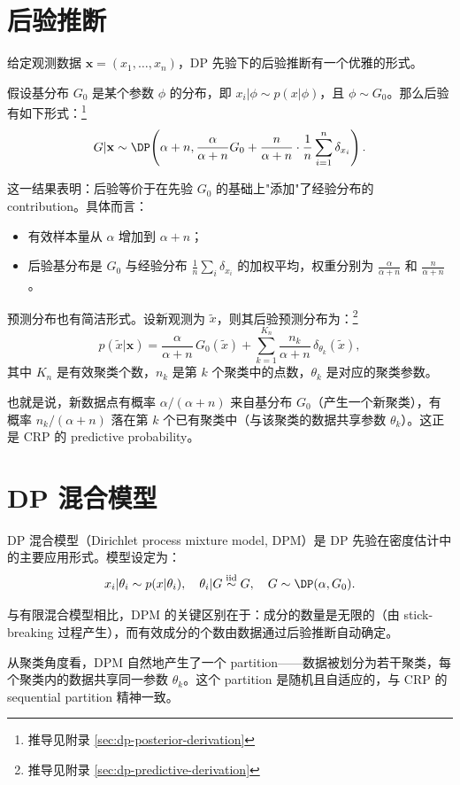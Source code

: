 \section{后验推断}

给定观测数据 $\mathbf{x} = (x_1, \ldots, x_n)$，DP 先验下的后验推断有一个优雅的形式。

假设基分布 $G_0$ 是某个参数 $\phi$ 的分布，即 $x_i | \phi \sim p(x | \phi)$，且 $\phi \sim G_0$。那么后验有如下形式：\footnote{推导见附录 \cref{sec:dp-posterior-derivation}}
\[
G | \mathbf{x} \sim \DP\!\left(\alpha + n, \frac{\alpha}{\alpha + n} G_0 + \frac{n}{\alpha + n} \cdot \frac{1}{n}\sum_{i=1}^n \delta_{x_i}\right).
\]

这一结果表明：后验等价于在先验 $G_0$ 的基础上"添加"了经验分布的 contribution。具体而言：
\begin{itemize}
  \item 有效样本量从 $\alpha$ 增加到 $\alpha + n$；
  \item 后验基分布是 $G_0$ 与经验分布 $\frac{1}{n}\sum_i \delta_{x_i}$ 的加权平均，权重分别为 $\frac{\alpha}{\alpha+n}$ 和 $\frac{n}{\alpha+n}$。
\end{itemize}

预测分布也有简洁形式。设新观测为 $\tilde{x}$，则其后验预测分布为：\footnote{推导见附录 \cref{sec:dp-predictive-derivation}}
\[
p(\tilde{x} | \mathbf{x}) = \frac{\alpha}{\alpha + n} \, G_0(\tilde{x}) + \sum_{k=1}^{K_n} \frac{n_k}{\alpha + n} \, \delta_{\theta_k}(\tilde{x}),
\]
其中 $K_n$ 是有效聚类个数，$n_k$ 是第 $k$ 个聚类中的点数，$\theta_k$ 是对应的聚类参数。

也就是说，新数据点有概率 $\alpha/(\alpha+n)$ 来自基分布 $G_0$（产生一个新聚类），有概率 $n_k/(\alpha+n)$ 落在第 $k$ 个已有聚类中（与该聚类的数据共享参数 $\theta_k$）。这正是 CRP 的 predictive probability。

\section{DP 混合模型}

DP 混合模型（Dirichlet process mixture model, DPM）是 DP 先验在密度估计中的主要应用形式。模型设定为：
\[
x_i | \theta_i \sim p(x | \theta_i), \quad \theta_i | G \stackrel{\mathrm{iid}}{\sim} G, \quad G \sim \DP(\alpha, G_0).
\]

与有限混合模型相比，DPM 的关键区别在于：成分的数量是无限的（由 stick-breaking 过程产生），而有效成分的个数由数据通过后验推断自动确定。

从聚类角度看，DPM 自然地产生了一个 partition——数据被划分为若干聚类，每个聚类内的数据共享同一参数 $\theta_k$。这个 partition 是随机且自适应的，与 CRP 的 sequential partition 精神一致。

